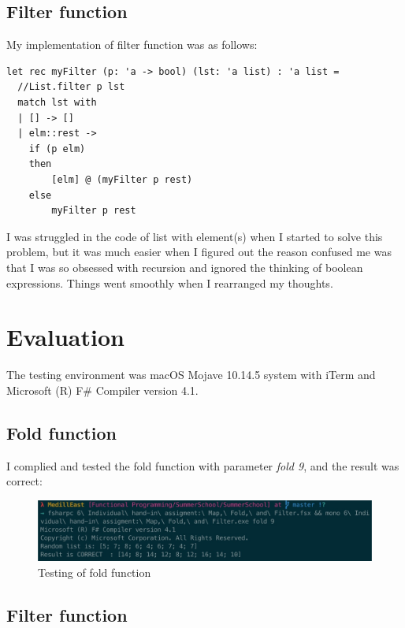 \subsection{Filter function}

My implementation of filter function was as follows:


\lstset{language=Csh}
\begin{lstlisting}
let rec myFilter (p: 'a -> bool) (lst: 'a list) : 'a list =
  //List.filter p lst
  match lst with
  | [] -> []
  | elm::rest -> 
    if (p elm)
    then 
        [elm] @ (myFilter p rest)
    else 
        myFilter p rest
\end{lstlisting}

I was struggled in the code of list with element(s) when I started to solve this problem, but it was much easier when I figured out the reason confused me was that I was so obsessed with recursion and ignored the thinking of boolean expressions. Things went smoothly when I rearranged my thoughts.

\section{Evaluation}

The testing environment was macOS Mojave 10.14.5 system with iTerm and Microsoft (R) F\# Compiler version 4.1.

\subsection{Fold function}

I complied and tested the fold function with parameter \emph{fold 9}, and the result was correct:

\begin{figure}[h]
      \centering
      \includegraphics[width=\linewidth]{fold}
      \caption{Testing of fold function}
      \label{fig:fold}
\end{figure}

\subsection{Filter function}

